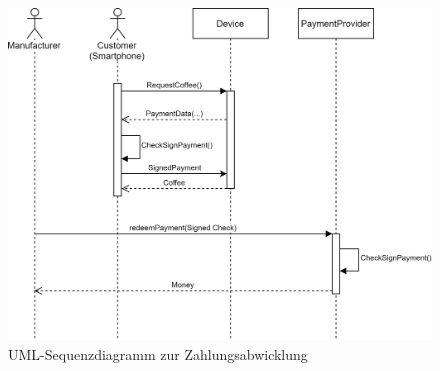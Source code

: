 \begin{figure}[h]
 \centering
 \includegraphics[width=1.0\textwidth]{gfx/UML_Seq-Usage.png}
 \caption{UML-Sequenzdiagramm zur Zahlungsabwicklung}
 \label{fig:chapter07:usage}
\end{figure}

